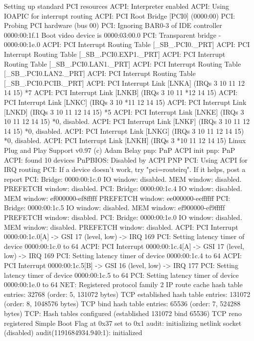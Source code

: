 \documentclass[mingoth,a4paper]{jsarticle}
\begin{document}
{{{{{{{{{{{{{\begin{commandline}
Setting up standard PCI resources
ACPI: Interpreter enabled
ACPI: Using IOAPIC for interrupt routing
ACPI: PCI Root Bridge [PCI0] (0000:00)
PCI: Probing PCI hardware (bus 00)
PCI: Ignoring BAR0-3 of IDE controller 0000:00:1f.1
Boot video device is 0000:03:00.0
PCI: Transparent bridge - 0000:00:1e.0
ACPI: PCI Interrupt Routing Table [\_SB_.PCI0._PRT]
ACPI: PCI Interrupt Routing Table [\_SB_.PCI0.EXP1._PRT]
ACPI: PCI Interrupt Routing Table [\_SB_.PCI0.LAN1._PRT]
ACPI: PCI Interrupt Routing Table [\_SB_.PCI0.LAN2._PRT]
ACPI: PCI Interrupt Routing Table [\_SB_.PCI0.PCIB._PRT]
ACPI: PCI Interrupt Link [LNKA] (IRQs 3 10 11 12 14 15) *7
ACPI: PCI Interrupt Link [LNKB] (IRQs 3 10 11 *12 14 15)
ACPI: PCI Interrupt Link [LNKC] (IRQs 3 10 *11 12 14 15)
ACPI: PCI Interrupt Link [LNKD] (IRQs 3 10 11 12 14 15) *5
ACPI: PCI Interrupt Link [LNKE] (IRQs 3 10 11 12 14 15) *0, disabled.
ACPI: PCI Interrupt Link [LNKF] (IRQs 3 10 11 12 14 15) *0, disabled.
ACPI: PCI Interrupt Link [LNKG] (IRQs 3 10 11 12 14 15) *0, disabled.
ACPI: PCI Interrupt Link [LNKH] (IRQs 3 *10 11 12 14 15)
Linux Plug and Play Support v0.97 (c) Adam Belay
pnp: PnP ACPI init
pnp: PnP ACPI: found 10 devices
PnPBIOS: Disabled by ACPI PNP
PCI: Using ACPI for IRQ routing
PCI: If a device doesn't work, try "pci=routeirq".  If it helps, post a report
PCI: Bridge: 0000:00:1c.0
  IO window: disabled.
  MEM window: disabled.
  PREFETCH window: disabled.
PCI: Bridge: 0000:00:1c.4
  IO window: disabled.
  MEM window: ef000000-ef8fffff
  PREFETCH window: ee000000-eeffffff
PCI: Bridge: 0000:00:1c.5
  IO window: disabled.
  MEM window: ef900000-ef9fffff
  PREFETCH window: disabled.
PCI: Bridge: 0000:00:1e.0
  IO window: disabled.
  MEM window: disabled.
  PREFETCH window: disabled.
ACPI: PCI Interrupt 0000:00:1c.0[A] -> GSI 17 (level, low) -> IRQ 169
PCI: Setting latency timer of device 0000:00:1c.0 to 64
ACPI: PCI Interrupt 0000:00:1c.4[A] -> GSI 17 (level, low) -> IRQ 169
PCI: Setting latency timer of device 0000:00:1c.4 to 64
ACPI: PCI Interrupt 0000:00:1c.5[B] -> GSI 16 (level, low) -> IRQ 177
PCI: Setting latency timer of device 0000:00:1c.5 to 64
PCI: Setting latency timer of device 0000:00:1e.0 to 64
NET: Registered protocol family 2
IP route cache hash table entries: 32768 (order: 5, 131072 bytes)
TCP established hash table entries: 131072 (order: 8, 1048576 bytes)
TCP bind hash table entries: 65536 (order: 7, 524288 bytes)
TCP: Hash tables configured (established 131072 bind 65536)
TCP reno registered
Simple Boot Flag at 0x37 set to 0x1
audit: initializing netlink socket (disabled)
audit(1191684934.940:1): initialized

\end{commandline}}}}}}}}}}}}}}
\end{document}
